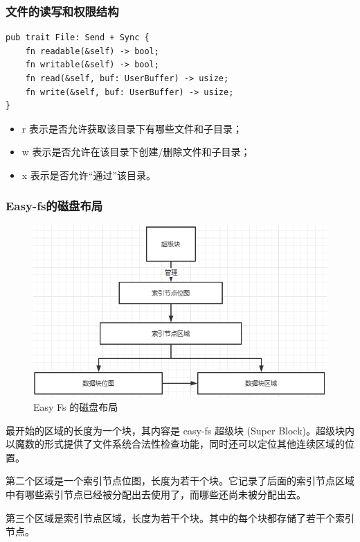 \subsubsection{文件的读写和权限结构}

\begin{lstlisting}[caption=文件系统基本读写]
pub trait File: Send + Sync {
    fn readable(&self) -> bool;
    fn writable(&self) -> bool;
    fn read(&self, buf: UserBuffer) -> usize;
    fn write(&self, buf: UserBuffer) -> usize;
}
\end{lstlisting}

\begin{itemize}
\item r 表示是否允许获取该目录下有哪些文件和子目录；
\item w 表示是否允许在该目录下创建/删除文件和子目录；
\item x 表示是否允许“通过”该目录。
\end{itemize}


\subsubsection{Easy-fs的磁盘布局}

\begin{figure}[htb]
    \figureCapSet
    \centering
    \includegraphics[width=.8\linewidth]{figure/c3/easyfsdevicemap.png}
    \caption{Easy Fs 的磁盘布局}
    \label{figure:c3easyfsdevicemap}
\end{figure}


最开始的区域的长度为一个块，其内容是 easy-fs 超级块 (Super Block)。超级块内以魔数的形式提供了文件系统合法性检查功能，同时还可以定位其他连续区域的位置。

第二个区域是一个索引节点位图，长度为若干个块。它记录了后面的索引节点区域中有哪些索引节点已经被分配出去使用了，而哪些还尚未被分配出去。

第三个区域是索引节点区域，长度为若干个块。其中的每个块都存储了若干个索引节点。


